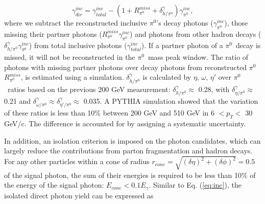 \documentclass[twocolumn,letterpaper,aps,prl,longbibliography,superscriptaddress,floatfix]{revtex4-2}
\newcommand{\pizero}{\ensuremath{\pi^0}}
\begin{document}
\begin{equation} \label{eq:inc}
\gamma_{dir}^{inc} = \gamma_{total}^{inc} - \left( 1 + R_{\pi^0}^{miss} + \delta_{h/\pi^0}^{\gamma} \right) \gamma_{\pi^0}^{inc},
\end{equation}
where we subtract the reconstructed inclusive \pizero's decay photons ($\gamma_{\pi^0}^{inc}$), those missing their partner photons ($R_{\pi^0}^{miss}\gamma_{\pi^0}^{inc}$) and photons from other hadron decays ($\delta_{h/\pi^0}^{\gamma}\gamma_{\pi^0}^{inc}$) from total inclusive photons ($\gamma_{total}^{inc}$). If a partner photon of a \pizero\ decay is missed, it will not be reconstructed in the \pizero\ mass peak window. The ratio of photons with missing partner photons over decay photons from reconstructed \pizero\, $R_{\pi^0}^{miss}$, is estimated using a simulation.
$\delta_{h/\pi^0}^{\gamma}$ is calculated by $\eta$, $\omega$, $\eta'$ over \pizero\ ratios based on the previous 200 GeV measurement\cite{PhysRevD.83.052004}: $\delta_{h/\pi^0}^{\gamma} \approx$ 0.28, with $\delta_{\eta/\pi^0}^{\gamma} \approx$ 0.21 and $\delta_{\omega/\pi^0}^{\gamma} \approx \delta_{\eta'/\pi^0}^{\gamma}  \approx$ 0.035. A PYTHIA \cite{Sjostrand:2006za} simulation showed that the variation of these ratios is less than 10\% between 200 GeV and 510 GeV in 6 $< p_T <$ 30 GeV/c. The difference is accounted for by assigning a systematic uncertainty.

In addition, an isolation criterion is imposed on the photon candidates, which can largely reduce the contributions from parton fragmentation and hadron decays. For any other particles within a cone of radius $r_{cone} = \sqrt{(\delta\eta)^2 + (\delta\phi)^2} = 0.5$ of the signal photon, the sum of their energies is required to be less than 10\% of the energy of the signal photon: $E_{cone} < 0.1 E_{\gamma}$. Similar to Eq. (\ref{eq:inc}), the isolated direct photon yield can be expressed as

\end{document}
